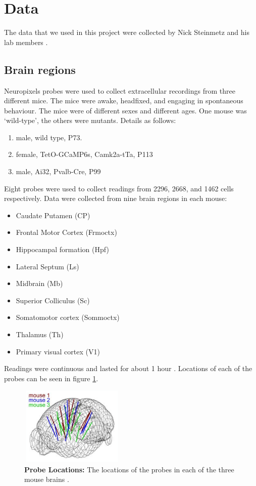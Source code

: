 \section{Data}

    The data that we used in this project were collected by Nick Steinmetz and his lab members \parencite{stringer}.

    \subsection{Brain regions}
    Neuropixels probes were used to collect extracellular recordings  \parencite{jun} from three different mice. The mice were awake, headfixed, and engaging in spontaneous behaviour. The mice were of different sexes and different ages. One mouse was `wild-type', the others were mutants. Details as follows:
    \begin{enumerate}
        \item male, wild type, P73. %
        \item female, TetO-GCaMP6s, Camk2a-tTa, P113 %
        \item male, Ai32, Pvalb-Cre, P99 %
    \end{enumerate}

    Eight probes were used to collect readings from 2296, 2668, and 1462 cells respectively. Data were collected from nine brain regions in each mouse:
    \begin{itemize}
        \item Caudate Putamen (CP)
        \item Frontal Motor Cortex (Frmoctx)
        \item Hippocampal formation (Hpf)
        \item Lateral Septum (Ls)
        \item Midbrain (Mb)
        \item Superior Colliculus (Sc)
        \item Somatomotor cortex (Sommoctx)
        \item Thalamus (Th)
        \item Primary visual cortex (V1)
    \end{itemize}
    Readings were continuous and lasted for about 1 hour  \parencite{stringer}. Locations of each of the probes can be seen in figure \ref{fig:probe_locations}.

    \begin{figure}[h]
        \centering
        \includegraphics[width=5cm,height=3.75cm]{figures/eight_probe/probe_locations_stringer.png}
        \caption{\textbf{Probe Locations:} The locations of the probes in each of the three mouse brains \parencite{stringer}.}
        \label{fig:probe_locations}
    \end{figure}

